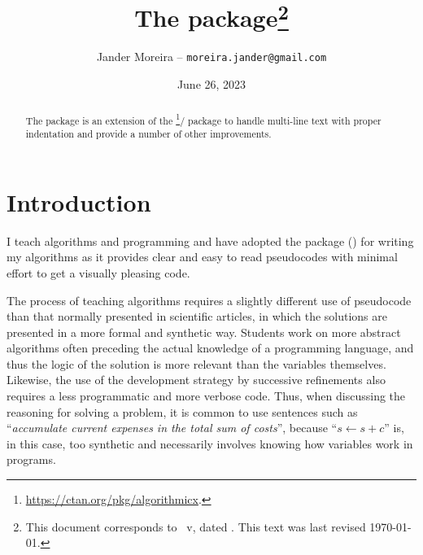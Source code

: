 \documentclass[a4paper, 11pt]{article}
\title{%
    The \PackageName{algxpar} package\thanks{This document corresponds to \PackageName{algxpar}~v\AlgVersion, dated \AlgDate.
    This text was last revised \today.}%
}
\author{Jander Moreira -- \texttt{moreira.jander@gmail.com}}
\date{June 26, 2023}
\begin{document}
\maketitle
\sloppy

\begin{abstract}
    The  package is an extension of the \footnote{\url{https://ctan.org/pkg/algorithmicx}.}/ package to handle multi-line text with proper indentation and provide a number of other improvements.
\end{abstract}

\tableofcontents

\begin{figure}
    \vspace{3em}
\end{figure}





\section{Introduction}
I teach algorithms and programming and have adopted the  package () for writing my algorithms as it provides clear and easy to read pseudocodes with minimal effort to get a visually pleasing code.

The process of teaching algorithms requires a slightly different use of pseudocode than that normally presented in scientific articles, in which the solutions are presented in a more formal and synthetic way. Students work on more abstract algorithms often preceding the actual knowledge of a programming language, and thus the logic of the solution is more relevant than the variables themselves. Likewise, the use of the development strategy by successive refinements also requires a less programmatic and more verbose code. Thus, when discussing the reasoning for solving a problem, it is common to use sentences such as ``\emph{accumulate current expenses in the total sum of costs}'', because ``${s \gets s + c}$'' is, in this case, too synthetic and necessarily involves knowing how variables work in programs.
\end{document}
